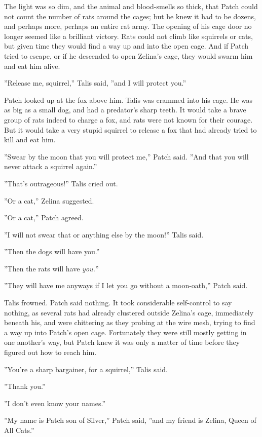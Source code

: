 \documentclass[12pt]{book}
\begin{document}
 The light was so dim, and the animal and blood-smells so thick, that Patch could not count the number of rats around the cages; but he knew it had to be dozens, and perhaps more, perhaps an entire rat army. The opening of his cage door no longer seemed like a brilliant victory. Rats could not climb like squirrels or cats, but given time they would find a way up and into the open cage. And if Patch tried to escape, or if he descended to open Zelina's cage, they would swarm him and eat him alive.\par
 ''Release me, squirrel,'' Talis said, ''and I will protect you.''\par
 Patch looked up at the fox above him. Talis was crammed into his cage. He was as big as a small dog, and had a predator's sharp teeth. It would take a brave group of rats indeed to charge a fox, and rats were not known for their courage. But it would take a very stupid squirrel to release a fox that had already tried to kill and eat him.\par
 ''Swear by the moon that you will protect me,'' Patch said. ''And that you will never attack a squirrel again.''\par
 ''That's outrageous!'' Talis cried out.\par
 ''Or a cat,'' Zelina suggested.\par
 ''Or a cat,'' Patch agreed.\par
 ''I will not swear that or anything else by the moon!'' Talis said.\par
 ''Then the dogs will have you.''\par
 ''Then the rats will have {\it you.}''\par
 ''They will have me anyways if I let you go without a moon-oath,'' Patch said.\par
 Talis frowned. Patch said nothing. It took considerable self-control to say nothing, as several rats had already clustered outside Zelina's cage, immediately beneath his, and were chittering as they probing at the wire mesh, trying to find a way up into Patch's open cage. Fortunately they were still mostly getting in one another's way, but Patch knew it was only a matter of time before they figured out how to reach him.\par
 ''You're a sharp bargainer, for a squirrel,'' Talis said.\par
 ''Thank you.''\par
''I don't even know your names.''\par
 ''My name is Patch son of Silver,'' Patch said, ''and my friend is Zelina, Queen of All Cats.''\par
\end{document}
